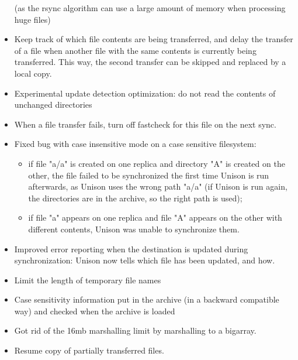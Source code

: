 \begin{changesfromversion}{2.32}
\begin{itemize}
  (as the rsync algorithm can use a large amount of memory when
   processing huge files)
\item Keep track of which file contents are being transferred, and delay
  the transfer of a file when another file with the same contents is
  currently being transferred.  This way, the second transfer can be
  skipped and replaced by a local copy.
\item Experimental update detection optimization:
  do not read the contents of unchanged directories
\item When a file transfer fails, turn off fastcheck for this file on the
  next sync.
\item Fixed bug with case insensitive mode on a case sensitive filesystem:
\begin{itemize}
\item
   if file "a/a" is created on one replica and directory "A" is
    created on the other, the file failed to be synchronized the first
    time Unison is run afterwards, as Unison uses the wrong path "a/a"
    (if Unison is run again, the directories are in the archive, so
     the right path is used);
  \item if file "a" appears on one replica and file "A" appears on the
    other with different contents, Unison was unable to synchronize
    them.
\end{itemize}
\item Improved error reporting when the destination is updated during
  synchronization: Unison now tells which file has been updated, and how.
\item Limit the length of temporary file names
\item Case sensitivity information put in the archive (in a backward
  compatible way) and checked when the archive is loaded
\item Got rid of the 16mb marshalling limit by marshalling to a bigarray.
\item Resume copy of partially transferred files.
\end{itemize}
\end{changesfromversion}

